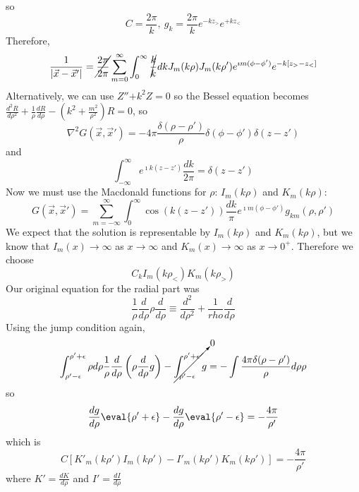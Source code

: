 \documentclass[a4paper,twoside,master.tex]{subfiles}
\begin{document}
so
\begin{equation}
    C = \frac{2\pi}{k},\ g_k= \frac{2\pi}{k}e^{-kz_>}e^{+kz_<}
\end{equation}
Therefore,
\begin{equation}
    \frac{1}{|\vec{x}-\vec{x}'|} = \cancel{\frac{2\pi}{2\pi}}\sum_{m=0}^\infty \int_0^\infty \cancel{\frac{k}{k}}dk J_m(k\rho) J_m(k\rho') e^{\imath m(\phi-\phi')}e^{-k[z_> - z_<]}
\end{equation}
Alternatively, we can use $Z''\bm{+}k^2Z = 0$ so the Bessel equation becomes $\frac{d^2 R}{d\rho^2}+\frac{1}{\rho} \frac{dR}{d\rho} - \left(k^2 + \frac{m^2}{\rho^2}\right)R = 0$, so
\begin{equation}
    \nabla^2 G(\vec{x},\vec{x}') = -4\pi \frac{\delta(\rho-\rho')}{\rho} \delta(\phi-\phi') \delta(z-z')
\end{equation}
and
\begin{equation}
    \int_{-\infty}^{\infty} e^{\imath k(z-z')} \frac{dk}{2\pi} = \delta(z-z')
\end{equation}
Now we must use the Macdonald functions for $\rho$: $I_m(k\rho)$ and $K_m(k\rho)$:
\begin{equation}
    G(\vec{x},\vec{x}') = \sum_{m=-\infty}^\infty \int_{0}^{\infty} \cos(k(z-z')) \frac{dk}{\pi} e^{\imath m(\phi-\phi')} g_{km}(\rho,\rho')
\end{equation}
We expect that the solution is representable by $I_m(k\rho)$ and $K_m(k\rho)$, but we know that $I_m(x)\to\infty$ as $x\to\infty$ and $K_m(x)\to\infty$ as $x\to 0^+$. Therefore we choose
\begin{equation}
    C_k I_m(k\rho_<) K_m(k\rho_>)
\end{equation}
Our original equation for the radial part was
\begin{equation}
    \frac{1}{\rho}\frac{d}{d\rho}\rho \frac{d}{d\rho} \equiv \frac{d^2}{d\rho^2} + \frac{1}{rho}\frac{d}{d\rho}
\end{equation}
Using the jump condition again,
\begin{equation}
    \int_{\rho'-\epsilon}^{\rho'+\epsilon}\rho d\rho \frac{1}{\rho} \frac{d}{d\rho}\left( \rho \frac{d}{d\rho} g \right) - \cancelto{0}{\int_{\rho'-\epsilon}^{\rho'+\epsilon} g} = -\int \frac{4\pi\delta(\rho-\rho')}{\rho} d\rho \rho
\end{equation}
so
\begin{equation}
    \frac{dg}{d\rho}\eval{\rho'+\epsilon} - \frac{dg}{d\rho}\eval{\rho'-\epsilon} = -\frac{4\pi}{\rho'}
\end{equation}
which is
\begin{equation}
    C[K'_m(k\rho') I_m(k\rho') - I'_m(k\rho')K_m(k\rho')] = -\frac{4\pi}{\rho'}
\end{equation}
where $K' = \frac{dK}{d\rho}$ and $I' = \frac{dI}{d\rho}$
\end{document}
